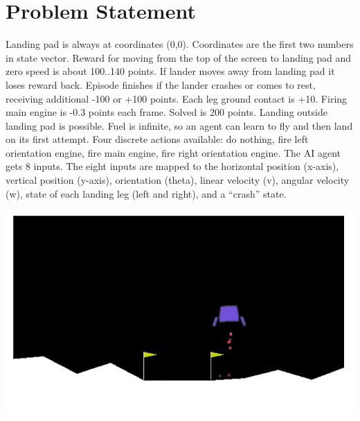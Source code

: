 \documentclass[12pt]{article}
\begin{document}
\section{Problem Statement}
Landing pad is always at coordinates (0,0). Coordinates are the first two numbers in state vector. Reward for moving from the top of the screen to landing pad and zero speed is about 100..140 points. If lander moves away from landing pad it loses reward back. Episode finishes if the lander crashes or comes to rest, receiving additional -100 or +100 points. Each leg ground contact is +10. Firing main engine is -0.3 points each frame. Solved is 200 points. Landing outside landing pad is possible. Fuel is infinite, so an agent can learn to fly and then land on its first attempt. Four discrete actions available: do nothing, fire left orientation engine, fire main engine, fire right orientation engine. The AI agent gets 8 inputs. The eight inputs are mapped to the horizontal position (x-axis), vertical position (y-axis), orientation (theta), linear velocity (v), angular velocity (w), state of each landing leg (left and right), and a “crash” state.
\begin{center}
\includegraphics[scale=0.5]{LunarLanderDemoImage.png}
\end{center}
\end{document}
